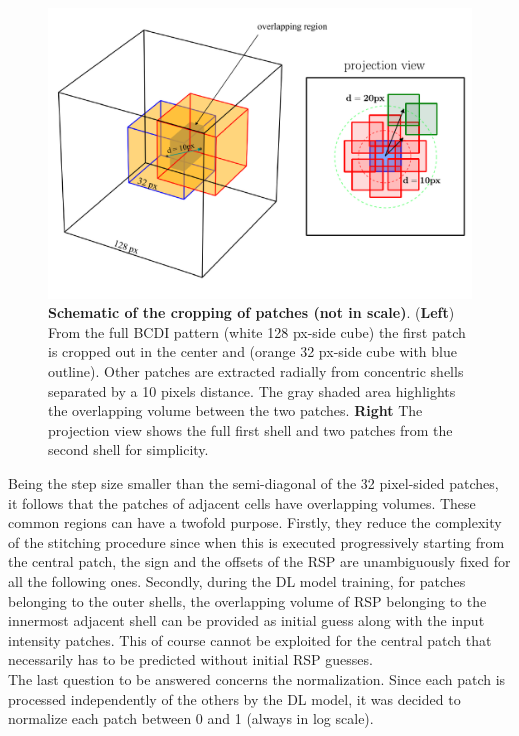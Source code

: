 \begin{figure}[H]
    \centering
    \includegraphics[width=\textwidth]{figures/Phasing/patching_cropping.pdf}
    \caption{\textbf{Schematic of the cropping of patches (not in scale)}. (\textbf{Left}) From the full BCDI pattern (white 128 px-side cube) the first patch is 
    cropped out in the center and (orange 32 px-side cube with blue outline). Other patches are extracted radially from 
    concentric shells separated by a 10 pixels distance. The gray shaded area highlights the overlapping volume between the 
    two patches. \textbf{Right} The projection view shows the full first shell and two patches from the second shell 
    for simplicity. 
     }
    
    \label{fig:patches_cropping}
\end{figure}

Being the step size smaller than the 
semi-diagonal of the 32 pixel-sided patches, it follows that the patches of adjacent cells have overlapping volumes. 
These common regions can have a twofold purpose. Firstly, they reduce the complexity of the stitching procedure since 
when this is executed progressively starting from the central patch, the sign and the offsets of the RSP are unambiguously 
fixed for all the following ones. Secondly, during the DL model training, for patches belonging to the outer shells, 
the overlapping volume of RSP belonging to the innermost adjacent shell can be provided as initial guess along with the input 
intensity patches. This of course cannot be exploited for the central patch that necessarily has to be predicted without 
initial RSP guesses. \\
The last question to be answered concerns the normalization. Since each patch is processed independently of the others 
by the DL model, it was decided to normalize each patch between 0 and 1 (always in log scale). 

